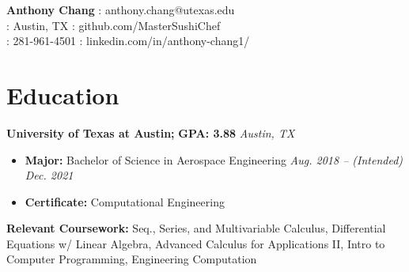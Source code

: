 \documentclass[letterpaper,11pt]{article}
\begin{document}
\textbf{\LARGE{Anthony Chang}} \hfill \faEnvelope: anthony.chang@utexas.edu\\
\faMapMarker: Austin, TX \hfill \faGithub: github.com/MasterSushiChef\\
\faPhone: 281-961-4501 \hfill \faLinkedinSquare: linkedin.com/in/anthony-chang1/

{
\section{Education}
\textbf{University of Texas at Austin;} \textbf{GPA: 3.88} \hfill \textit{Austin, TX}\\
\begin{itemize}[noitemsep, topsep=0pt, leftmargin=0.7cm]
  \item \textbf{\small{Major:}} Bachelor of Science in Aerospace Engineering \hfill \textit{Aug. 2018 -- (Intended) Dec. 2021}\\
  \item \textbf{\small{Certificate:}} Computational Engineering\\
\end{itemize}
\textbf{\small{Relevant Coursework:}} Seq., Series, and Multivariable Calculus, Differential Equations w/ Linear Algebra,
Advanced Calculus for Applications II, Intro to Computer Programming, Engineering Computation
}
\end{document}
